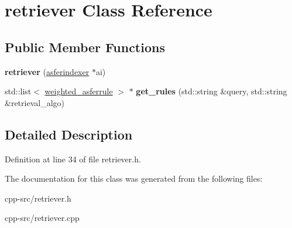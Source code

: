 \hypertarget{classretriever}{\section{retriever Class Reference}
\label{classretriever}
}
\subsection*{Public Member Functions}
\begin{DoxyCompactItemize}
\item 
\hypertarget{classretriever_a3bc7b6fc200affab514911769997eade}{{\bfseries retriever} (\hyperlink{classasferindexer}{asferindexer} $\ast$ai)}\label{classretriever_a3bc7b6fc200affab514911769997eade}

\item 
\hypertarget{classretriever_a7e36635d07b2d31fea1a3f06c42825ff}{std\-::list$<$ \hyperlink{structweighted__asferrule}{weighted\-\_\-asferrule} $>$ $\ast$ {\bfseries get\-\_\-rules} (std\-::string \&query, std\-::string \&retrieval\-\_\-algo)}\label{classretriever_a7e36635d07b2d31fea1a3f06c42825ff}

\end{DoxyCompactItemize}


\subsection{Detailed Description}


Definition at line 34 of file retriever.\-h.



The documentation for this class was generated from the following files\-:\begin{DoxyCompactItemize}
\item 
cpp-\/src/retriever.\-h\item 
cpp-\/src/retriever.\-cpp\end{DoxyCompactItemize}
